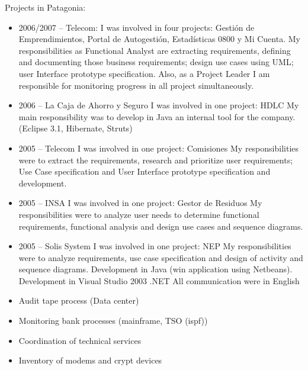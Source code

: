 \documentclass[11pt,a4paper,sans]{moderncv}
\begin{document}
Projects in Patagonia:
\begin{itemize}
  \item 2006/2007 – Telecom: \newline{}
I was involved in four projects: Gestión de Emprendimientos, Portal de Autogestión, Estadísticas 0800 y Mi Cuenta.
My responsibilities as Functional Analyst are extracting requirements, defining and documenting those business requirements; design use cases using UML;  user Interface prototype specification. Also, as a Project Leader I am responsible for monitoring progress in all project simultaneously.

  \item 2006 –  La Caja de Ahorro y Seguro \newline{}
I was involved in one project: HDLC
My main responsibility was to develop in Java an internal tool for the company. (Eclipse 3.1, Hibernate, Struts)

  \item 2005 – Telecom \newline{}
I was involved in one project: Comisiones
My responsibilities were to extract the requirements, research and prioritize user requirements; Use Case specification and User Interface prototype specification and development.

  \item 2005 – INSA \newline{}
I was involved in one project: Gestor de Residuos
My responsibilities were to analyze user needs to determine functional requirements, functional analysis and design use cases and sequence diagrams.

  \item 2005 – Solis System \newline{}
I was involved in one project: NEP
My responsibilities were to analyze requirements, use case specification and design of activity and sequence diagrams.
Development in Java (win application using Netbeans).
Development in Visual Studio 2003 .NET
All communication were in English
\newline{}
\end{itemize}



\begin{itemize}
  \item Audit tape process (Data center)
  \item Monitoring bank processes (mainframe, TSO (ispf))
  \item Coordination of technical services
  \item Inventory of modems and crypt devices
  \newline{}
\end{itemize}
\end{document}

